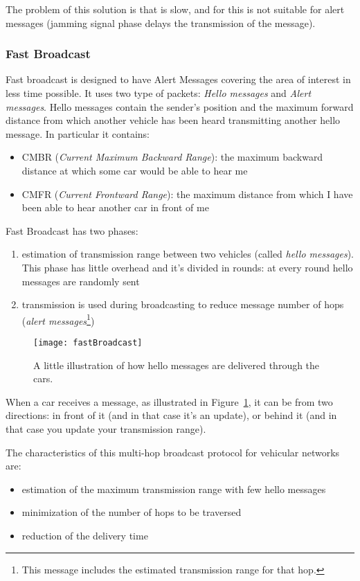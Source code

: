 The problem of this solution is that is slow, and for this is not suitable for
alert messages (jamming signal phase delays the transmission of the message).

\subsubsection{Fast Broadcast}
Fast broadcast is designed to have Alert Messages covering the area of interest
in less time possible. It uses two type of packets: \textit{Hello messages} and
\textit{Alert messages}. Hello messages contain the sender's position and the
maximum forward distance from which another vehicle has been heard transmitting
another hello message. In particular it contains:
\begin{itemize}
\item CMBR (\textit{Current Maximum Backward Range}): the maximum backward
  distance at which some car would be able to hear me
\item CMFR (\textit{Current Frontward Range}): the maximum distance from which
  I have been able to hear another car in front of me
\end{itemize}

Fast Broadcast has two phases:
\begin{enumerate}
\item estimation of transmission range between two vehicles (called
  \textit{hello messages}). This phase has little overhead and it's divided in
  rounds: at every round
  hello messages are randomly sent
\item transmission is used during broadcasting to reduce message number of hops
  (\textit{alert messages}\footnote{This message includes the estimated
  transmission range for that hop.})
\end{enumerate}

\begin{figure}
  \centering
  \texttt{[image: fastBroadcast]}
  \caption[Hello Message propagation]{A little illustration of how hello
    messages are delivered through the cars.}
  \label{fig:802.11ws:helloMessageDelivery}
\end{figure}

When a car receives a message, as illustrated in
Figure~\ref{fig:802.11ws:helloMessageDelivery}, it can be from two directions:
in front of it (and in that case it's an update), or behind it (and in that case
you update your transmission range).

The characteristics of this multi-hop broadcast protocol for vehicular networks
are:
\begin{itemize}
\item estimation of the maximum transmission range with few hello messages
\item minimization of the number of hops to be traversed
\item reduction of the delivery time
\end{itemize}

